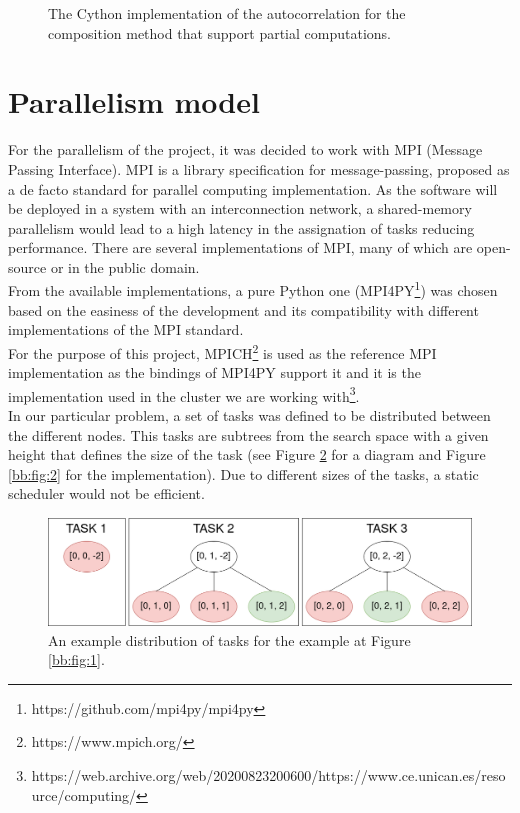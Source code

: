       \begin{figure}[ht!]
        \caption{The Cython implementation of the autocorrelation for the composition method that support partial computations.}
        \label{composite_auto:fig:2}
      \end{figure}


  \section{Parallelism model}

  For the parallelism of the project, it was decided to work with MPI (Message
  Passing Interface).  MPI is a library specification for message-passing, proposed
  as a de facto standard for parallel computing implementation. As the software
  will be deployed in a system with an interconnection network, a shared-memory
  parallelism would lead to a high latency in the assignation of tasks
  reducing performance. There are several implementations of MPI, many of which are
  open-source or in the public domain.\\

 From the available implementations, a pure
 Python one (MPI4PY\footnote{https://github.com/mpi4py/mpi4py}) was chosen based on
 the easiness of the development and its compatibility with different
 implementations of the MPI standard.\\

 For the purpose of this project, MPICH\footnote{https://www.mpich.org/} is used as
 the reference MPI implementation as the bindings of MPI4PY support it and it is
 the implementation used in the cluster we are working with\footnote{https://web.archive.org/web/20200823200600/https://www.ce.unican.es/resource/computing/}.\\

  In our particular problem, a set of tasks was defined to be
  distributed between the different nodes. This tasks are subtrees from the
  search space with a given height that defines the size of the task  (see Figure
  \ref{tasks:fig:1} for a diagram and Figure \ref{bb:fig:2} for the
  implementation). Due to different sizes of the tasks,  a static
  scheduler would not be efficient.\\

  \begin{figure}[ht!]
    \begin{center}
      \includegraphics[scale=0.4]{Chapters/Implementation/Example_tasks.png}
    \end{center}
    \caption{An example distribution of tasks for the example at Figure
    \ref{bb:fig:1}.}
    \label{tasks:fig:1}
  \end{figure}


